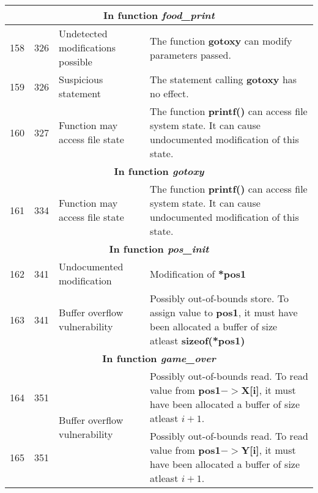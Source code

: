 \documentclass[]{article}
\begin{document}
\begin{longtable}{ |p{0.5cm}|p{0.75cm}|p{3cm}|p{9cm}|  }
		\hline 
		\multicolumn{4}{|c|}{\textbf{In function \textit{food\_print}}} \\
		\hline 
		
		158 & 326 & Undetected modifications possible & The function \textbf{gotoxy} can modify parameters passed. \\
		\hline 
		159 & 326 & Suspicious statement & The statement calling \textbf{gotoxy} has no effect. \\
		\hline 
		160 & 327 & Function may access file state & The function \textbf{printf()} can access file system state. It can cause undocumented modification of this state. \\
		
		\hline 
		\multicolumn{4}{|c|}{\textbf{In function \textit{gotoxy}}} \\
		\hline 
		
		161 & 334 & Function may access file state & The function \textbf{printf()} can access file system state. It can cause undocumented modification of this state. \\
		
		\hline 
		\multicolumn{4}{|c|}{\textbf{In function \textit{pos\_init}}} \\
		\hline 
		
		162 & 341 & Undocumented modification & Modification of \textbf{*pos1} \\
		\hline 
		163 & 341 & Buffer overflow vulnerability & Possibly out-of-bounds store. To assign value to \textbf{pos1}, it must have been allocated a buffer of size atleast \textbf{sizeof(*pos1)} \\
		\hline 
		
		\multicolumn{4}{|c|}{\textbf{In function \textit{game\_over}}} \\
		\hline 
 		
 		164 & 351 & \multirow{2}{60.0pt}{Buffer overflow vulnerability} & Possibly out-of-bounds read. To read value from \textbf{pos1$->$X[i]}, it must have been allocated a buffer of size atleast $i + 1$.  \\
 		165 & 351 & & Possibly out-of-bounds read. To read value from \textbf{pos1$->$Y[i]}, it must have been allocated a buffer of size atleast $i + 1$.  \\
 		

\end{longtable}
\end{document}
